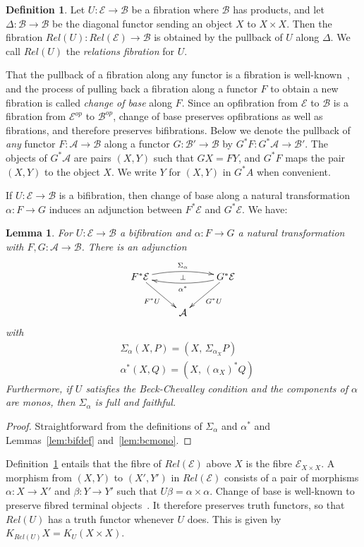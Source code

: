 \documentclass{LMCS}
\newcommand{\ra}{\rightarrow}
\newcommand\E{{\mathcal E}}
\newcommand\B{{\mathcal B}}
\newcommand\A{{\mathcal A}}
\theoremstyle{plain}
\newtheorem{lemma}[theorem]{Lemma}
\theoremstyle{remark}
\theoremstyle{definition}
\newtheorem{definition}[theorem]{Definition}
\begin{document}
\begin{definition}\label{def:cob}
  Let $U:\E \ra \B$ be a fibration where $\B$ has products, and let
  $\Delta:\B \ra \B$ be the diagonal functor sending an object $X$ to
  $X \times X$. Then the fibration $Rel(U):Rel(\E) \ra \B$ is obtained
  by the pullback of $U$ along $\Delta$. We call $Rel(U)$ the {\em
    relations fibration} for $U$.
\end{definition}

That the pullback of a fibration along any functor is a fibration is
well-known~\cite{jac94}, and the process of pulling back a fibration
along a functor $F$ to obtain a new fibration is called {\em change of
  base} along $F$. Since an opfibration from $\E$ to $\B$ is a
fibration from $\E^{op}$ to $\B^{op}$, change of base preserves
opfibrations as well as fibrations, and therefore preserves
bifibrations. Below we denote the pullback of {\em any} functor $F:\A
\ra \B$ along a functor $G:\B' \ra \B$ by $G^*F: G^*\A \ra \B'$. The
objects of $G^*\A$ are pairs $(X,Y)$ such that $GX = FY$, and $G^*F$
maps the pair $(X,Y)$ to the object $X$.  We write $Y$ for $(X,Y)$ in
$G^*A$ when convenient.

If $U : \E \to \B$ is a bifibration, then change of base along a
natural transformation $\alpha : F \to G$ induces an adjunction
between $F^*\E$ and $G^*\E$. We have:

\begin{lemma}\label{lem:natadj}
  For $U:\E\to\B$ a bifibration and $\alpha:F\to G$ a natural
  transformation with $F,G:\A\to\B$. There is an adjunction
  \[\xymatrix{F^*\E \ar[rd]_{F^*U} \ar@/^/[rr]^{\Sigma_\alpha}
    \ar@{}[rr]|\bot&& \ar@/^/[ll]^{\alpha^*} G^*\E \ar[ld]^{G^*U}\\&\A}\]
  with
  \begin{align*}
    &\Sigma_\alpha (X,P) = (X,\,\Sigma_{\alpha_X} P)\\
    &\alpha^*(X,Q) = (X,\,(\alpha_X)^*Q)
  \end{align*}
Furthermore, if $U$ satisfies the Beck-Chevalley condition 
and the components of $\alpha$ are monos, then $\Sigma_\alpha$ is full
and faithful.
\end{lemma}
\begin{proof}
  Straightforward from the definitions of $\Sigma_\alpha$ and
  $\alpha^*$ and Lemmas~\ref{lem:bifdef} and~\ref{lem:bcmono}.
\end{proof}

Definition~\ref{def:cob} entails that the fibre of $Rel(\E)$ above $X$
is the fibre $\E_{X \times X}$. A morphism from $(X,Y)$ to $(X',Y')$
in $Rel(\E)$ consists of a pair of morphisms $\alpha : X \to X'$ and
$\beta : Y \to Y'$ such that $U \beta = \alpha \times \alpha$. Change
of base is well-known to preserve fibred terminal
objects~\cite{her93b}. It therefore preserves truth functors, so that
$Rel(U)$ has a truth functor whenever $U$ does. This is given by
$K_{Rel(U)} X = K_U (X \times X)$.
\end{document}
